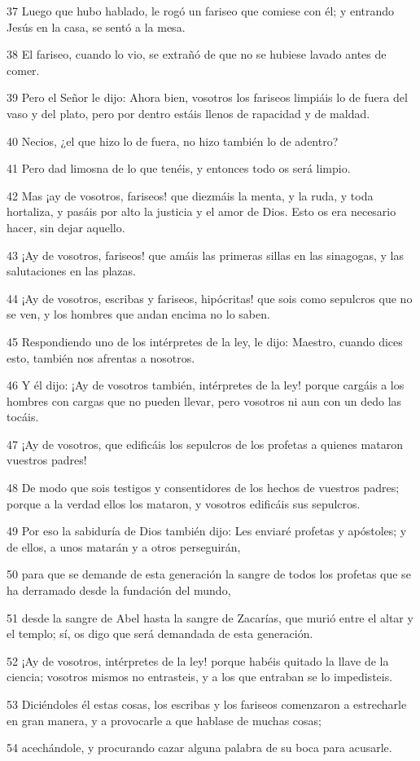 \par 37 Luego que hubo hablado, le rogó un fariseo que comiese con él; y entrando Jesús en la casa, se sentó a la mesa.
\par 38 El fariseo, cuando lo vio, se extrañó de que no se hubiese lavado antes de comer.
\par 39 Pero el Señor le dijo: Ahora bien, vosotros los fariseos limpiáis lo de fuera del vaso y del plato, pero por dentro estáis llenos de rapacidad y de maldad.
\par 40 Necios, ¿el que hizo lo de fuera, no hizo también lo de adentro?
\par 41 Pero dad limosna de lo que tenéis, y entonces todo os será limpio.
\par 42 Mas ¡ay de vosotros, fariseos! que diezmáis la menta, y la ruda, y toda hortaliza, y pasáis por alto la justicia y el amor de Dios. Esto os era necesario hacer, sin dejar aquello.
\par 43 ¡Ay de vosotros, fariseos! que amáis las primeras sillas en las sinagogas, y las salutaciones en las plazas.
\par 44 ¡Ay de vosotros, escribas y fariseos, hipócritas! que sois como sepulcros que no se ven, y los hombres que andan encima no lo saben.
\par 45 Respondiendo uno de los intérpretes de la ley, le dijo: Maestro, cuando dices esto, también nos afrentas a nosotros.
\par 46 Y él dijo: ¡Ay de vosotros también, intérpretes de la ley! porque cargáis a los hombres con cargas que no pueden llevar, pero vosotros ni aun con un dedo las tocáis.
\par 47 ¡Ay de vosotros, que edificáis los sepulcros de los profetas a quienes mataron vuestros padres!
\par 48 De modo que sois testigos y consentidores de los hechos de vuestros padres; porque a la verdad ellos los mataron, y vosotros edificáis sus sepulcros.
\par 49 Por eso la sabiduría de Dios también dijo: Les enviaré profetas y apóstoles; y de ellos, a unos matarán y a otros perseguirán,
\par 50 para que se demande de esta generación la sangre de todos los profetas que se ha derramado desde la fundación del mundo,
\par 51 desde la sangre de Abel hasta la sangre de Zacarías, que murió entre el altar y el templo; sí, os digo que será demandada de esta generación.
\par 52 ¡Ay de vosotros, intérpretes de la ley! porque habéis quitado la llave de la ciencia; vosotros mismos no entrasteis, y a los que entraban se lo impedisteis.
\par 53 Diciéndoles él estas cosas, los escribas y los fariseos comenzaron a estrecharle en gran manera, y a provocarle a que hablase de muchas cosas;
\par 54 acechándole, y procurando cazar alguna palabra de su boca para acusarle.

